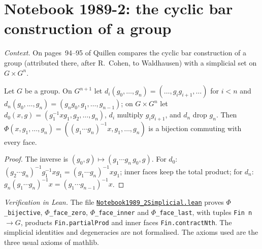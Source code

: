 \section[Notebook 1989-2: the cyclic bar construction]{Notebook 1989-2: the cyclic bar construction of a group\protect{}}\label{sec:quillen-1989-2-simplicial}

\emph{Context.} On pages~94--95 of  Quillen compares the cyclic bar construction of a group (attributed there, after R.~Cohen, to Waldhausen) with a simplicial set on $G \times G^n$.

\begin{encadre}
\begin{theoreme}\label{thm:quillen-1989-2-simplicial}
Let $G$ be a group. On $G^{n+1}$ let $d_i(g_0, \dots, g_n) = (\dots, g_ig_{i+1}, \dots)$ for $i < n$ and $d_n(g_0, \dots, g_n) = (g_ng_0, g_1, \dots, g_{n-1})$; on $G \times G^n$ let $d_0(x, g) = (g_1^{-1}xg_1, g_2, \dots, g_n)$, $d_i$ multiply $g_ig_{i+1}$, and $d_n$ drop $g_n$. Then $\Phi(x, g_1, \dots, g_n) = ((g_1\cdots g_n)^{-1}x, g_1, \dots, g_n)$ is a bijection commuting with every face.
\end{theoreme}
\end{encadre}

\begin{proof}
The inverse is $(g_0, g) \mapsto (g_1\cdots g_n\,g_0, g)$. For $d_0$: $(g_2\cdots g_n)^{-1}g_1^{-1}xg_1 = (g_1\cdots g_n)^{-1}xg_1$; inner faces keep the total product; for $d_n$: $g_n(g_1\cdots g_n)^{-1}x = (g_1\cdots g_{n-1})^{-1}x$.
\end{proof}

\emph{Verification in Lean.} The file \href{\leanblobmain/Notebook1989_2Simplicial.lean}{\texttt{Notebook1989\_2Simplicial.\allowbreak{}lean}} proves \texttt{$\Phi$\_bijective}, \texttt{$\Phi$\_face\_zero}, \texttt{$\Phi$\_face\_inner} and \texttt{$\Phi$\_face\_last}, with tuples \texttt{Fin n} $\to G$, products \texttt{Fin.partialProd} and inner faces \texttt{Fin.contractNth}. The simplicial identities and degeneracies are not formalised. The axioms used are the three usual axioms of mathlib.

